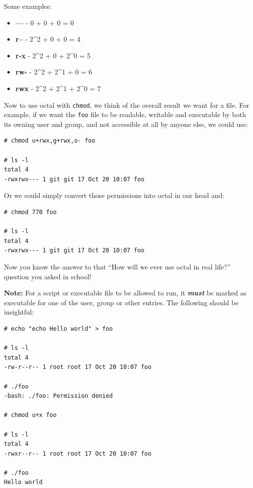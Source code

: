 \documentclass[10pt,]{book}
\numberwithin{figure}{chapter}
\begin{document}
Some examples:

\begin{itemize}
\itemsep1pt\parskip0pt
\item
  \textbf{---} - 0 + 0 + 0 = 0
\item
  \textbf{r--} - 2\^{}2 + 0 + 0 = 4
\item
  \textbf{r-x} - 2\^{}2 + 0 + 2\^{}0 = 5
\item
  \textbf{rw-} - 2\^{}2 + 2\^{}1 + 0 = 6
\item
  \textbf{rwx} - 2\^{}2 + 2\^{}1 + 2\^{}0 = 7
\end{itemize}

Now to use octal with \texttt{chmod}, we think of the overall result we
want for a file. For example, if we want the \texttt{foo} file to be
readable, writable and executable by both its owning user and group, and
not accessible at all by anyone else, we could use:

\begin{verbatim}
# chmod u+rwx,g+rwx,o- foo

# ls -l
total 4
-rwxrwx--- 1 git git 17 Oct 20 10:07 foo
\end{verbatim}

Or we could simply convert those permissions into octal in our head and:

\begin{verbatim}
# chmod 770 foo

# ls -l
total 4
-rwxrwx--- 1 git git 17 Oct 20 10:07 foo
\end{verbatim}

Now you know the answer to that ``How will we ever use octal in real
life?'' question you asked in school!

\textbf{Note:} For a script or executable file to be allowed to run, it
\textbf{\emph{must}} be marked as executable for one of the user, group
or other entries. The following should be insightful:

\begin{verbatim}
# echo "echo Hello world" > foo

# ls -l
total 4
-rw-r--r-- 1 root root 17 Oct 20 10:07 foo

# ./foo
-bash: ./foo: Permission denied

# chmod u+x foo

# ls -l
total 4
-rwxr--r-- 1 root root 17 Oct 20 10:07 foo

# ./foo
Hello world
\end{verbatim}
\end{document}
